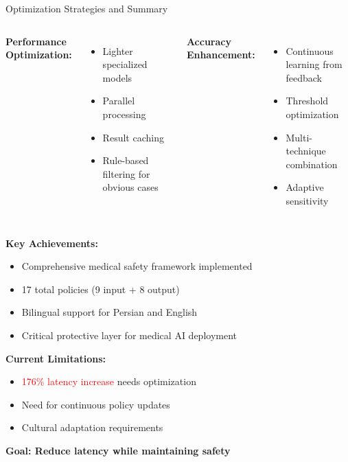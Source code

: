 \begin{frame}{Optimization Strategies and Summary}
    \begin{columns}[T]
        \textbf{Performance Optimization:}
        \begin{itemize}
            \item Lighter specialized models
            \item Parallel processing
            \item Result caching
            \item Rule-based filtering for obvious cases
        \end{itemize}
        
        \textbf{Accuracy Enhancement:}
        \begin{itemize}
            \item Continuous learning from feedback
            \item Threshold optimization
            \item Multi-technique combination
            \item Adaptive sensitivity
        \end{itemize}
    \end{columns}
    
    \vspace{0.5em}
    
    \textbf{Key Achievements:}
    \begin{itemize}
        \item Comprehensive medical safety framework implemented
        \item 17 total policies (9 input + 8 output)
        \item Bilingual support for Persian and English
        \item Critical protective layer for medical AI deployment
    \end{itemize}
    
    \vspace{0.5em}
    
    \textbf{Current Limitations:}
    \begin{itemize}
        \item \textcolor{red}{176\% latency increase} needs optimization
        \item Need for continuous policy updates
        \item Cultural adaptation requirements
    \end{itemize}
    
    \begin{center}
        \colorbox{highlight!20}{\textbf{Goal: Reduce latency while maintaining safety}}
    \end{center}
\end{frame}
